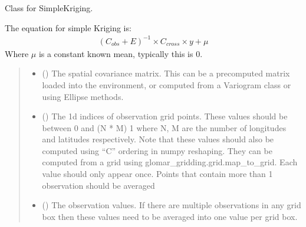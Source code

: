 \documentclass[letterpaper,10pt,english]{sphinxmanual}
\begin{document}
\begin{fulllineitems}
\label{\detokenize{kriging:glomar_gridding.kriging.SimpleKriging}}
\pysigstartsignatures
\pysiglinewithargsret
{}
{\sphinxparamcomma {}\sphinxparamcomma {}\sphinxparamcomma {}}
{}
\pysigstopsignatures
\sphinxAtStartPar
Class for SimpleKriging.

\sphinxAtStartPar
The equation for simple Kriging is:
\begin{equation*}
\begin{split}(C_{obs} + E)^{-1} \times C_{cross} \times y + \mu\end{split}
\end{equation*}
\sphinxAtStartPar
Where \(\mu\) is a constant known mean, typically this is 0.
\begin{quote}\begin{description}
\begin{itemize}
\item {}
\sphinxAtStartPar
{} () \textendash{} The spatial covariance matrix. This can be a pre\sphinxhyphen{}computed matrix loaded
into the environment, or computed from a Variogram class or using
Ellipse methods.

\item {}
\sphinxAtStartPar
{} () \textendash{} The 1d indices of observation grid points. These values should be
between 0 and (N * M) \sphinxhyphen{} 1 where N, M are the number of longitudes
and latitudes respectively. Note that these values should also be
computed using “C” ordering in numpy reshaping. They can be
computed from a grid using glomar\_gridding.grid.map\_to\_grid. Each
value should only appear once. Points that contain more than 1
observation should be averaged

\item {}
\sphinxAtStartPar
{} () \textendash{} The observation values. If there are multiple observations in any
grid box then these values need to be averaged into one value per
grid box.


\end{itemize}
\end{description}
\end{quote}
\end{fulllineitems}
\end{document}
